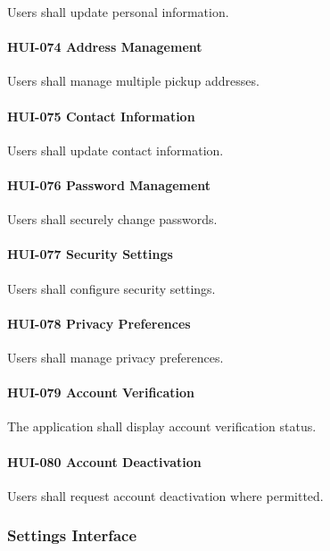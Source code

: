 Users shall update personal information.

\paragraph{HUI-074 Address Management}

Users shall manage multiple pickup addresses.

\paragraph{HUI-075 Contact Information}

Users shall update contact information.

\paragraph{HUI-076 Password Management}

Users shall securely change passwords.

\paragraph{HUI-077 Security Settings}

Users shall configure security settings.

\paragraph{HUI-078 Privacy Preferences}

Users shall manage privacy preferences.

\paragraph{HUI-079 Account Verification}

The application shall display account verification status.

\paragraph{HUI-080 Account Deactivation}

Users shall request account deactivation where permitted.


\subsubsection*{Settings Interface}

